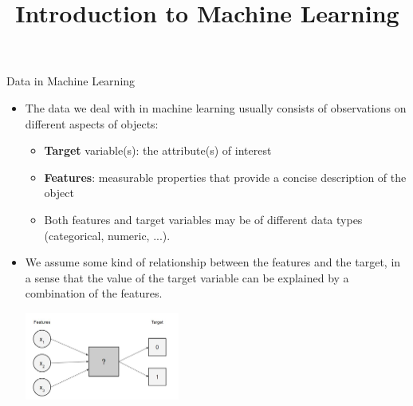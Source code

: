 \documentclass[11pt,compress,t,notes=noshow, xcolor=table]{beamer}
\title{Introduction to Machine Learning}
\institute{\href{https://compstat-lmu.github.io/lecture_i2ml/}{compstat-lmu.github.io/lecture\_i2ml}}
\date{}
\begin{document}









\begin{vbframe}{Data in Machine Learning}

\begin{itemize}

  \item The data we deal with in machine learning usually consists of 
  observations on different aspects of objects:
  
  \begin{itemize}
  
    \item \textbf{Target} variable(s): the attribute(s) of interest

    \item \textbf{Features}: measurable properties that provide a concise 
    description of the object 
    
    \item Both features and target variables may be of different data types 
    (categorical, numeric, ...).

  \end{itemize}
  
  \item We assume some kind of relationship between the features and the target,
  in a sense that the value of the target variable can be explained by a 
  combination of the features.
  

    \includegraphics[width = 0.4\textwidth]{figure_man/feat_targ_rel.jpg}
    

\end{itemize}
\end{vbframe}
\end{document}
